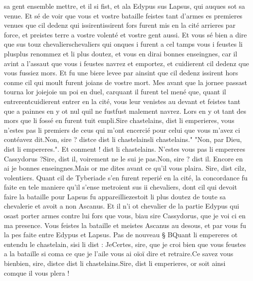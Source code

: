 \documentclass{article}
\begin{document}
\begin{pages}
      sa gent ensemble mettre, et il si fist, et ala Edypus sus 
      Lapsus, qui auques sot sa venue. Et sé de voir que vous et vostre bataille feistes 
      tant d’armes es premieres venues que cil dedenz qui issirentissirent fors 
      furent mis en la cité arrieres par force, et preistes terre a vostre volenté et vostre gent aussi. 
      Et vous sé bien a dire que sus touz 
      chevalierschevaliers qui onques i furent a cel tamps 
      vous i feustes li plusplus renommez et li plus doutez, 
      et vous en dirai bonnes enseingnes, car il avint a l’assaut que vous i feustes navrez et emportez, et cuidierent cil dedenz 
      que vous fussiez mors. Et fu une biere levee par ainsint que cil dedenz issirent hors conme cil qui moult furent joians de vostre mort. 
      Mes avant que la jornee passast tourna lor joiejoie un poi en duel, 
      carquant il furent tel mené que, 
      quant il entrerentcuidierent entrer en la cité, 
      vous leur venistes au devant et feistes tant que a painnes en y ot nul quil ne 
      fustfust malement navrez. 
   Lors en y ot tant des mors que li fossé en furent tuit empli.Sire chastelains, dist li emperieres, 
      vous n’estes pas li premiers de ceus qui m’ont encercié pour celui que vous 
      m’avez ci contéavez dit.Non, sire ? distce dist 
      li 
         chastelainsli chastelains." "Non, par Dieu, dist li empereres.".
      Et conment ! dist li chastelains. 
      N’estes vous pas li empereres Cassydorus ?Sire, dist il, voirement ne le sui je pas.Non, sire ? dist il. Encore en ai je bonnes enseingnes.Mais or me dites avant ce qu’il vous plaira.
   Sire, dist cilz, volentiers. \pend
\pstart Quant cil de Tyberiade s’en furent reperié en la cité, 
   la concordance fu faite en tele maniere qu’il s’ense metroient sus 
   ii chevaliers, dont cil qui devoit faire la bataille pour Lapsus 
   fu appareilliezestoit li plus doutez de toute sa chevalerie 
      et avoit a non Ascanus. Et il 
   n’i ot chevalier de la partie 
   Edypus qui osast porter armes contre lui fors que vous, 
   biau sire Cassydorus, que je voi ci en ma presence. 
   Vous feistes la bataille et meistes Ascanus au desous, et par vous fu la pes faite entre 
   Edypus et Lapsus. \pend
\pstart Pas de nouveau § BQuant li empereres 
   ot entendu le chastelain, sisi li dist :
   JeCertes, sire, que je 
      croi bien que vous feustes a la bataille si coma ce que 
      je l’aile vous ai 
      oïoï dire et retraire.Ce savez vous bienbien, sire, 
      distce dist li chastelains.Sire, dist li emperieres, or soit ainsi 
      comque il vous plera ! 

\end{pages}
\end{document}
